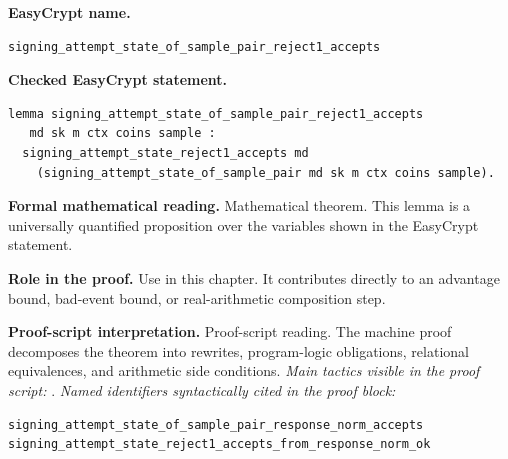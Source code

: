 \begin{formaltheorem}
\noindent\textbf{EasyCrypt name.}
\begin{lstlisting}[language=EasyCrypt,basicstyle=\ttfamily\scriptsize]
signing_attempt_state_of_sample_pair_reject1_accepts
\end{lstlisting}
\noindent\textbf{Checked EasyCrypt statement.}
\begin{lstlisting}[language=EasyCrypt,basicstyle=\ttfamily\scriptsize]
lemma signing_attempt_state_of_sample_pair_reject1_accepts
   md sk m ctx coins sample :
  signing_attempt_state_reject1_accepts md
    (signing_attempt_state_of_sample_pair md sk m ctx coins sample).
\end{lstlisting}
\noindent\textbf{Formal mathematical reading.}
Mathematical theorem. This lemma is a universally quantified proposition over the variables shown in the EasyCrypt statement.

\noindent\textbf{Role in the proof.}
Use in this chapter. It contributes directly to an advantage bound, bad-event bound, or real-arithmetic composition step.

\noindent\textbf{Proof-script interpretation.}
Proof-script reading. The machine proof decomposes the theorem into rewrites, program-logic obligations, relational equivalences, and arithmetic side conditions.
\emph{Main tactics visible in the proof script:} .
\emph{Named identifiers syntactically cited in the proof block:}
\begin{lstlisting}[language=EasyCrypt,basicstyle=\ttfamily\scriptsize]
signing_attempt_state_of_sample_pair_response_norm_accepts
signing_attempt_state_reject1_accepts_from_response_norm_ok
\end{lstlisting}

\end{formaltheorem}

